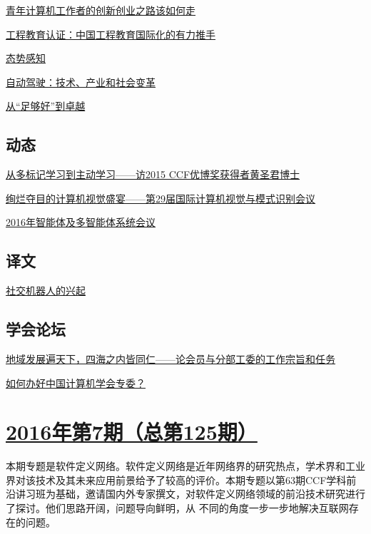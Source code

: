 \documentclass[a4paper]{article}
\begin{document}
\href{http://history.ccf.org.cn/resources/1190201776262/2016/08/11/yocsef.pdf}{青年计算机工作者的创新创业之路该如何走}

\href{http://history.ccf.org.cn/resources/1190201776262/2016/08/11/chendaoxu.pdf}{工程教育认证：中国工程教育国际化的有力推手}

\href{http://history.ccf.org.cn/resources/1190201776262/2016/08/11/david.pdf}{态势感知}

\href{http://history.ccf.org.cn/resources/1190201776262/2016/08/11/wugansha.pdf}{自动驾驶：技术、产业和社会变革}

\href{http://history.ccf.org.cn/resources/1190201776262/2016/08/11/zhengweimin.pdf}{从“足够好”到卓越}

\subsection{动态}
\href{http://history.ccf.org.cn/resources/1190201776262/2016/08/11/huangshengjun.pdf}{从多标记学习到主动学习——访2015 CCF优博奖获得者黄圣君博士}

\href{http://history.ccf.org.cn/resources/1190201776262/2016/08/11/meitao.pdf}{绚烂夺目的计算机视觉盛宴——第29届国际计算机视觉与模式识别会议}

\href{http://history.ccf.org.cn/resources/1190201776262/2016/08/11/anbo.pdf}{2016年智能体及多智能体系统会议}

\subsection{译文}
\href{http://history.ccf.org.cn/resources/1190201776262/2016/08/11/yiwen.pdf}{社交机器人的兴起}

\subsection{学会论坛}
\href{http://history.ccf.org.cn/resources/1190201776262/2016/08/11/luoxun.pdf}{地域发展遍天下，四海之内皆同仁——论会员与分部工委的工作宗旨和任务}

\href{http://history.ccf.org.cn/resources/1190201776262/2016/08/11/hushimin.pdf}{如何办好中国计算机学会专委？}


\section{\href{http://history.ccf.org.cn/sites/ccf/jsjtbbd.jsp?contentId=2936476895120}{\textbf{2016年第7期（总第125期）}}}
本期专题是软件定义网络。软件定义网络是近年网络界的研究热点，学术界和工业界对该技术及其未来应用前景给予了较高的评价。本期专题以第63期CCF学科前沿讲习班为基础，邀请国内外专家撰文，对软件定义网络领域的前沿技术研究进行了探讨。他们思路开阔，问题导向鲜明，从
不同的角度一步一步地解决互联网存在的问题。
\end{document}
